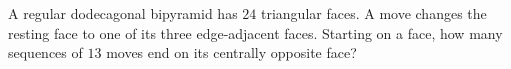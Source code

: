 A regular dodecagonal bipyramid has $24$ triangular faces. A move changes the resting face to one of its three edge-adjacent faces. Starting on a face, how many sequences of $13$ moves end on its centrally opposite face?
